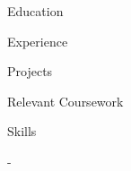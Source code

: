\documentclass{resume} %
\begin{document}

\begin{rSection}{Education}
\end{rSection}


\begin{rSection}{Experience}
\end{rSection}


\begin{rSection}{Projects}
\end{rSection}


\begin{rSection}{Relevant Coursework}
\end{rSection}


\begin{rSection}{Skills}
\end{rSection}-
\end{document}
